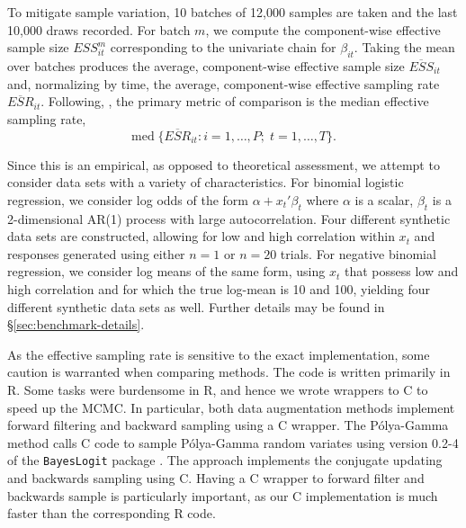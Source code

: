 \documentclass[11pt]{article}
\newcommand{\Polya}{P\'{o}lya}
\begin{document}
To mitigate sample variation, 10 batches of 12,000 samples are taken and the
last 10,000 draws recorded.  For batch $m$, we compute the component-wise
effective sample size $ESS_{it}^{m}$ corresponding to the univariate chain for
$\beta_{it}$.  Taking the mean over batches produces the average, component-wise
effective sample size $\overline{ESS}_{it}$ and, normalizing by time, the
average, component-wise effective sampling rate $\overline{ESR}_{it}$.
Following, \cite{fruhwirth-schnatter-fruhwirth-2010}, the primary metric of
comparison is the median effective sampling rate,
\[
\text{med} \; \Big\{ \overline{ESR}_{it} : i=1, \ldots, P; \;  t=1, \ldots, T \Big\}.
\]

Since this is an empirical, as opposed to theoretical assessment, we attempt to
consider data sets with a variety of characteristics.  For binomial logistic
regression, we consider log odds of the form $\alpha + x_t' \beta_t$ where
$\alpha$ is a scalar, $\beta_t$ is a 2-dimensional AR(1) process with large
autocorrelation.  Four different synthetic data sets are constructed, allowing
for low and high correlation within $x_t$ and responses generated using either
$n=1$ or $n=20$ trials.  For negative binomial regression, we consider log means
of the same form, using $x_t$ that possess low and high correlation and for
which the true log-mean is 10 and 100, yielding four different synthetic data
sets as well.  Further details may be found in \S \ref{sec:benchmark-details}.

As the effective sampling rate is sensitive to the exact implementation, some
caution is warranted when comparing methods. The code is written primarily in R.
Some tasks were burdensome in R, and hence we wrote wrappers to C to speed up
the MCMC.  In particular, both data augmentation methods implement forward
filtering and backward sampling using a C wrapper.  The \Polya-Gamma method
calls C code to sample \Polya-Gamma random variates using version 0.2-4 of the
\texttt{BayesLogit} package \citep{bayeslogit-2013}.  The
\cite{ravines-etal-2006} approach implements the conjugate updating and
backwards sampling using C.  Having a C wrapper to forward filter and backwards
sample is particularly important, as our C implementation is much faster than
the corresponding R code.
\end{document}
